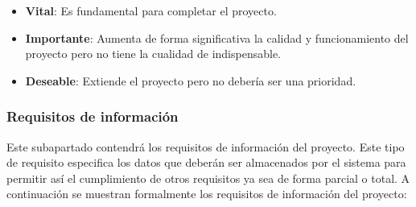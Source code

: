 \begin{itemize}
	\item \textbf{Vital}: Es fundamental para completar el proyecto.
	\item \textbf{Importante}: Aumenta de forma significativa la calidad y funcionamiento del proyecto pero no tiene la cualidad de indispensable.
	\item \textbf{Deseable}: Extiende el proyecto pero no debería ser una prioridad.
\end{itemize}

\bigskip

\subsubsection{Requisitos de información}

Este subapartado contendrá los requisitos de información del proyecto. Este tipo de requisito especifica los datos que deberán ser almacenados por el sistema para permitir así el cumplimiento de otros requisitos ya sea de forma parcial o total. A continuación se muestran formalmente los requisitos de información del proyecto:

\setcounter{contador_requisitos_de_informacion}{1}


